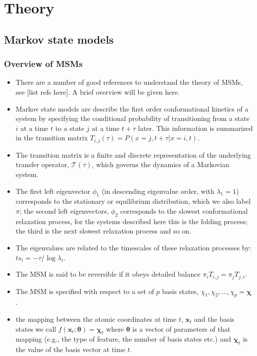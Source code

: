 \documentclass[journal=jacsat,manuscript=article]{achemso}
\begin{document}
\section{Theory}\label{theory}
\subsection{Markov state models}
\subsubsection{Overview of MSMs}
\begin{itemize}
    \item There are a number of good references to understand the theory of MSMs, see [list refs here].  A brief overview will be given here. 
    \item Markov state models are describe the first order conformational kinetics of a system by specifying the conditional probability of transitioning from a state $i$ at a time $t$ to a state $j$ at a time $t+\tau$  later. This information is summarized in the transition matrix $T_{i, j}(\tau) = P(x=j, t+\tau | x=i, t)$.
    \item The transition matrix is a finite and discrete representation of the underlying transfer operator, $\mathcal{T}(\tau)$, which governs the dynamics of a Markovian system. 
    \item  The first left eigenvector $\phi_1$ (in descending eigenvalue order, with $\lambda_{1} = 1$) corresponds to the stationary or equilibrium distribution, which we also label $\pi$; the second left eigenvectors, $\phi_2$ corresponds to the slowest conformational relaxation process, for the systems described here this is the folding process; the third is the next slowest relaxation process and so on. 
    \item  The eigenvalues are related to the timescales of these relaxation processes by: $ts_{i} = -\tau/\log{\lambda_i}$.  
    \item The MSM is said to be reversible if it obeys detailed balance $\pi_i T_{i, j}=\pi_j T_{j, i}$. 
    \item The MSM is specified with respect to a set of $p$ basis states, $\chi_1, \chi_2, ..., \chi_p = \bm{\chi}$. 
    \item the mapping between the atomic coordinates at time $t$, $\mathbf{x}_{t}$ and the basis states we call $f(\mathbf{x}_{t}; \bm{\theta}) =  \bm{\chi}_t$ where $\bm{\theta}$ is a vector of parameters of that mapping (e.g., the type of feature, the number of basis states etc.) and $\bm{\chi}_{t}$ is the value of the basis vector at time $t$. 

\end{itemize}
\end{document}
